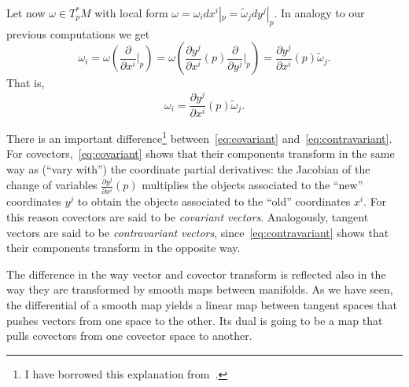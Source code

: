 Let now $\omega\in T_p^*M$ with local form $\omega = \omega_i dx^i|_p = \widetilde \omega_j dy^j|_p$.
In analogy to our previous computations we get
\begin{equation}
	\omega_i
	= \omega\left(\frac{\partial}{\partial x^i}\Big|_p\right)
	= \omega\left(\frac{\partial y^j}{\partial x^i}(p) \frac{\partial}{\partial y^j}\Big|_p\right)
	= \frac{\partial y^j}{\partial x^i}(p) \widetilde\omega_j.
\end{equation}
That is,
\begin{equation}\label{eq:covariant}
	\omega_i = \frac{\partial y^j}{\partial x^i}(p) \widetilde\omega_j.
\end{equation}

There is an important difference\footnote{I have borrowed this explanation from~\cite[Chapter 11]{book:lee}.} between~\eqref{eq:covariant} and~\eqref{eq:contravariant}.
For covectors,~\eqref{eq:covariant} shows that their components transform in the same way as (``vary with'') the coordinate partial derivatives: the Jacobian of the change of variables $\frac{\partial y^j}{\partial x^i}(p)$ multiplies the objects associated to the ``new'' coordinates $y^j$ to obtain the objects associated to the ``old'' coordinates $x^i$.
For this reason covectors are said to be \emph{covariant vectors}.
Analogously, tangent vectors are said to be \emph{contravariant vectors}, since~\eqref{eq:contravariant} shows that their components transform in the opposite way.

The difference in the way vector and covector transform is reflected also in the way they are transformed by smooth maps between manifolds.
As we have seen, the differential of a smooth map yields a linear map between tangent spaces that pushes vectors from one space to the other.
Its dual is going to be a map that pulls covectors from one covector space to another.


